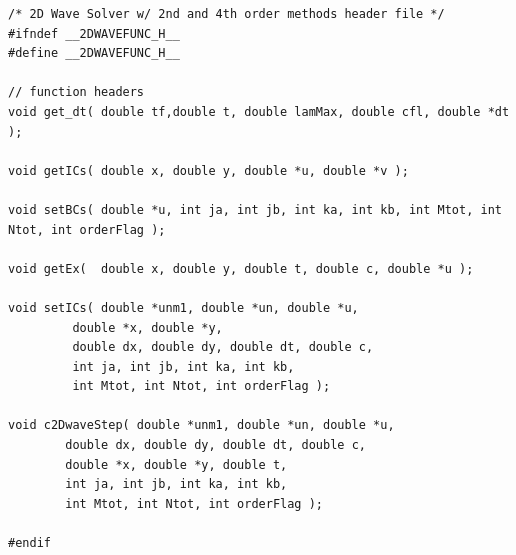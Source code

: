 \begin{lstlisting}[frame=single]
/* 2D Wave Solver w/ 2nd and 4th order methods header file */
#ifndef __2DWAVEFUNC_H__
#define __2DWAVEFUNC_H__

// function headers
void get_dt( double tf,double t, double lamMax, double cfl, double *dt );

void getICs( double x, double y, double *u, double *v );

void setBCs( double *u, int ja, int jb, int ka, int kb, int Mtot, int Ntot, int orderFlag );

void getEx(  double x, double y, double t, double c, double *u );

void setICs( double *unm1, double *un, double *u,
	     double *x, double *y,
	     double dx, double dy, double dt, double c,
	     int ja, int jb, int ka, int kb,
	     int Mtot, int Ntot, int orderFlag );
  
void c2DwaveStep( double *unm1, double *un, double *u,
		double dx, double dy, double dt, double c,
		double *x, double *y, double t,
		int ja, int jb, int ka, int kb,
		int Mtot, int Ntot, int orderFlag );

#endif
\end{lstlisting}

